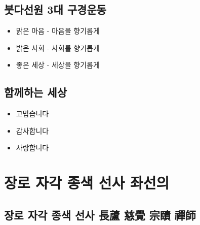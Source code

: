 \documentclass[12pt, a4paper, oneside]{book}
\let\stdsection\section
\renewcommand\section{\newpage\stdsection}
\begin{document}
	\section{붓다선원 3대 구경운동 }


\begin{itemize}[					
		topsep=0.0em,			
		parsep=0.0em,			
		itemsep=0em,			
		leftmargin=		2	em,
		labelwidth=1em,			
		labelsep=1em			
]					
	\item	맑은 마음 - 마음을 향기롭게
	\item	밝은 사회 - 사회를 향기롭게
	\item	좋은 세상 - 세상을 향기롭게
\end{itemize}					


%
	\section{함께하는 세상 }


\begin{itemize}[					
		topsep=0.0em,			
		parsep=0.0em,			
		itemsep=0em,			
		leftmargin=		2	em,
		labelwidth=1em,			
		labelsep=1em			
]					
	\item	고맙습니다
	\item	감사합니다
	\item	사랑합니다
\end{itemize}					




	\chapter{장로 자각 종색 선사 좌선의}
	\noptcrule

	\newpage	
	\minitoc

%
	\section{장로 자각 종색 선사 長蘆 慈覺 宗賾 禪師 }


\end{document}
